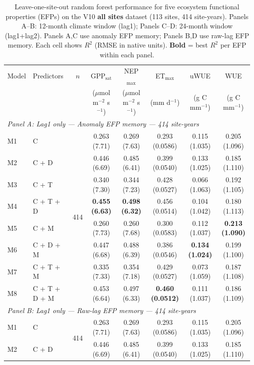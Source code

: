 \begin{table}[htbp]
\centering
\caption{Leave-one-site-out random forest performance for five ecosystem functional properties (EFPs) on the V10 \textbf{all sites} dataset (113 sites, 414 site-years). Panels A--B: 12-month climate window (lag1); Panels C--D: 24-month window (lag1+lag2). Panels A,C use anomaly EFP memory; Panels B,D use raw-lag EFP memory. Each cell shows $R^2$ (RMSE in native units). \textbf{Bold} = best $R^2$ per EFP within each panel.}
\label{tab:RF_LOSO_v10_all_sites}
\footnotesize
\setlength{\tabcolsep}{4pt}
\begin{tabular}{llcccccc}
\toprule
Model & Predictors & $n$ & GPP$_\mathrm{sat}$ & NEP$_\mathrm{max}$ & ET$_\mathrm{max}$ & uWUE & WUE \\
  &  &  & ($\mu$mol m$^{-2}$ s$^{-1}$) & ($\mu$mol m$^{-2}$ s$^{-1}$) & (mm d$^{-1}$) & (g C mm$^{-1}$) & (g C mm$^{-1}$) \\
\midrule
\multicolumn{8}{l}{\textit{Panel A: Lag1 only --- Anomaly EFP memory --- 414 site-years}} \\
\midrule
M1 & C & \multirow{8}{*}{414} & 0.263 (7.71) & 0.269 (7.63) & 0.293 (0.0586) & 0.115 (1.035) & 0.205 (1.096) \\
M2 & C + D &  & 0.446 (6.69) & 0.485 (6.41) & 0.399 (0.0540) & 0.133 (1.025) & 0.185 (1.110) \\
M3 & C + T &  & 0.340 (7.30) & 0.344 (7.23) & 0.428 (0.0527) & 0.066 (1.063) & 0.192 (1.105) \\
M4 & C + T + D &  & \textbf{0.455 (6.63)} & \textbf{0.498 (6.32)} & 0.456 (0.0514) & 0.104 (1.042) & 0.180 (1.113) \\
M5 & C + M &  & 0.260 (7.73) & 0.260 (7.68) & 0.300 (0.0583) & 0.112 (1.037) & \textbf{0.213 (1.090)} \\
M6 & C + D + M &  & 0.447 (6.68) & 0.488 (6.39) & 0.386 (0.0546) & \textbf{0.134 (1.024)} & 0.199 (1.100) \\
M7 & C + T + M &  & 0.335 (7.33) & 0.354 (7.18) & 0.429 (0.0527) & 0.073 (1.059) & 0.187 (1.108) \\
M8 & C + T + D + M &  & 0.453 (6.64) & 0.497 (6.33) & \textbf{0.460 (0.0512)} & 0.111 (1.037) & 0.186 (1.109) \\
\midrule
\multicolumn{8}{l}{\textit{Panel B: Lag1 only --- Raw-lag EFP memory --- 414 site-years}} \\
\midrule
M1 & C & \multirow{8}{*}{414} & 0.263 (7.71) & 0.269 (7.63) & 0.293 (0.0586) & 0.115 (1.035) & 0.205 (1.096) \\
M2 & C + D &  & 0.446 (6.69) & 0.485 (6.41) & 0.399 (0.0540) & 0.133 (1.025) & 0.185 (1.110) \\

\end{tabular}
\end{table}
